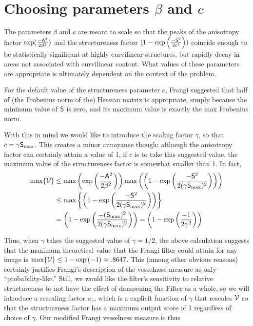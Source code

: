 \section{Choosing parameters $\beta$ and $c$}

The parameters $\beta$ and $c$ are meant to scale so that the peaks of the anisotropy factor $\exp(\frac{-\mathsf{A}^2}{2\beta^2})$ and the structureness factor $(1-\exp\left(\frac{-\mathsf{S}^2}{2c^2}\right))$ coincide enough to be statistically significant at highly curvilinear structures, but rapidly decay in areas not associated with curvilinear content. What values of these parameters are appropriate is ultimately dependent on the context of the problem.

For the default value of the structureness parameter $c$, Frangi suggested that half of (the Frobenius norm of the) Hessian matrix is appropriate, simply because the minimum value of $\mathsf{S}$ is zero, and its maximum value is exactly the max Frobenius norm.

With this in mind we would like to introduce the scaling factor $\gamma$, so that $ c = \gamma \mathsf{S}_{\max}$. This creates a minor annoyance though: although the anisotropy factor can certainly attain a value of 1, if $c$ is to take this suggested value, the maximum value of the structureness factor is somewhat smaller than 1. In fact,
\begin{equation}
\begin{aligned}
\max\{\mathcal{V} \} &\le \max\left(
\exp\left(\frac{-\mathsf{A}^2}{2\beta^2}\right)
\right)
\max\left(
\left(1 - \exp\left(\frac{-\mathsf{S}^2}{2(\gamma \mathsf{S}_{\max})^2}\right)\right)
\right) \\
&\le \max\left\{
\left(1 - \exp\left(\frac{-\mathsf{S}^2}{2(\gamma \mathsf{S}_{\max})^2}\right)\right)
\right\} \\
&= 
\left(1 - \exp\left(\frac{-(\mathsf{S}_{\max})^2}{2(\gamma \mathsf{S}_{\max})^2}\right)
\right)
= \left(1 - \exp\left(\frac{-1}{2\gamma^2}\right)
\right)
\end{aligned}
\end{equation}

Thus, when $\gamma$ takes the suggested value of $\gamma = 1/2$, the above calculation suggests that
the maximum theoretical value that the Frangi filter could attain for any image is
$ \max \{ \mathcal{V} \} \le 1 - \exp\left( -1 \right) \approx .8647$.
This (among other obvious reasons) certainly justifies Frangi's description of the vesselness measure as only ``probability-like.'' Still, we would like the filter's sensitivity to relative structureness to not have the effect of dampening the Filter as a whole, so we will introduce a rescaling factor $a_\gamma$, which is a explicit function of $\gamma$ that rescales $\mathcal{V}$ so that the structureness factor has a maximum output score of 1 regardless of choice of $\gamma$. Our modified Frangi vesselness measure is thus

